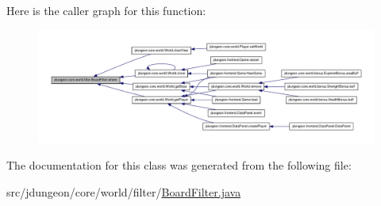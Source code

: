 Here is the caller graph for this function:
\nopagebreak
\begin{figure}[H]
\begin{center}
\leavevmode
\includegraphics[width=400pt]{classjdungeon_1_1core_1_1world_1_1filter_1_1_board_filter_aaa128c13b73053b766383e23b5f2a964_icgraph}
\end{center}
\end{figure}




The documentation for this class was generated from the following file:\begin{DoxyCompactItemize}
\item 
src/jdungeon/core/world/filter/\hyperlink{_board_filter_8java}{BoardFilter.java}\end{DoxyCompactItemize}
